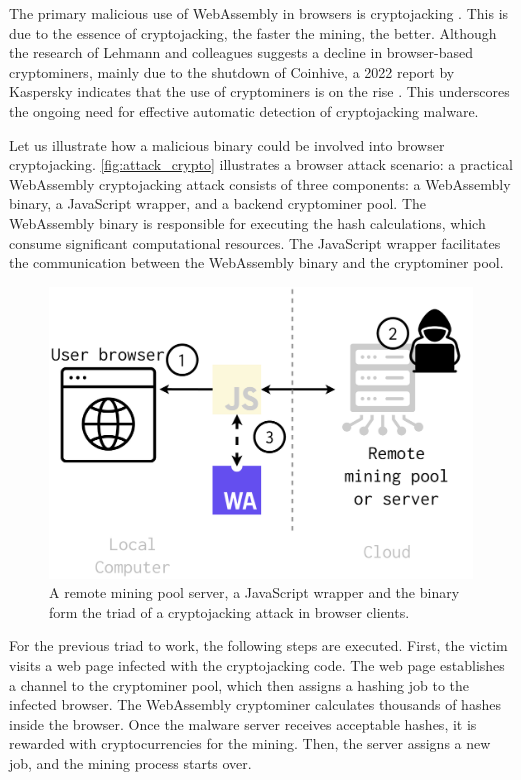 \label{offensive_app}

The primary malicious use of WebAssembly in browsers is cryptojacking \cite{musch2019new}. 
This is due to the essence of cryptojacking, the faster the mining, the better. 
Although the research of Lehmann and colleagues \cite{Hilbig2021AnES} suggests a decline in browser-based cryptominers, mainly due to the shutdown of Coinhive, a 2022 report by Kaspersky indicates that the use of cryptominers is on the rise \cite{kasperksy}. 
This underscores the ongoing need for effective automatic detection of cryptojacking malware.


Let us illustrate how a malicious \wasm binary could be involved into browser cryptojacking.
\autoref{fig:attack_crypto} illustrates a browser attack scenario:
a practical WebAssembly cryptojacking attack consists of three components: a WebAssembly binary, a JavaScript wrapper, and a backend cryptominer pool. 
The WebAssembly binary is responsible for executing the hash calculations, which consume significant computational resources. 
The JavaScript wrapper facilitates the communication between the WebAssembly binary and the cryptominer pool.

\begin{figure}[h]
    \centering
    \includegraphics[width=0.6\linewidth]{figures/attack_crypto.pdf}
    \caption{A remote mining pool server, a JavaScript wrapper and the \Wasm binary form the triad of a cryptojacking attack in browser clients.}
    \label{fig:attack_crypto}
\end{figure}

For the previous triad to work, the following steps are executed.
First, the victim visits a web page infected with the cryptojacking code. 
The web page establishes a channel to the cryptominer pool, which then assigns a hashing job to the infected browser. 
The WebAssembly cryptominer calculates thousands of hashes inside the browser. 
Once the malware server receives acceptable hashes, it is rewarded with cryptocurrencies for the mining. 
Then, the server assigns a new job, and the mining process starts over.

